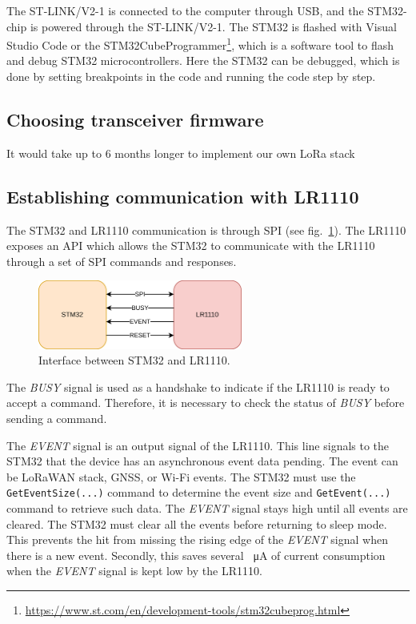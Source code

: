 The ST-LINK/V2-1 is connected to the computer through \ac{USB}, and the STM32-chip is powered through the ST-LINK/V2-1. The STM32 is flashed with Visual Studio Code or the STM32CubeProgrammer\footnote{\url{https://www.st.com/en/development-tools/stm32cubeprog.html}}, which is a software tool to flash and debug STM32 microcontrollers. Here the STM32 can be debugged, which is done by setting breakpoints in the code and running the code step by step.

\subsection{Choosing transceiver firmware}
It would take up to 6 months longer to implement our own \ac{LoRa} stack

\subsection{Establishing communication with LR1110}
The STM32 and LR1110 communication is through \ac{SPI} (see fig.~\ref{fig:stm32_lr1110_interface}). The LR1110 exposes an \ac{API} which allows the STM32 to communicate with the LR1110 through a set of \ac{SPI} commands and responses.

\begin{figure}[H]
    \centering
    \includegraphics[width=0.6\textwidth]{figures/STM32_LR1110_interface.png}
    \caption{Interface between STM32 and LR1110.}
    \label{fig:stm32_lr1110_interface}
\end{figure}

The \textit{BUSY} signal is used as a handshake to indicate if the LR1110 is ready to accept a command. Therefore, it is necessary to check the status of \textit{BUSY} before sending a command.

The \textit{EVENT} signal is an output signal of the LR1110. This line signals to the STM32 that the device has an asynchronous event data pending. The event can be \ac{LoRaWAN} stack, \ac{GNSS}, or Wi-Fi events. The STM32 must use the \lstinline[style=C++]{GetEventSize(...)} command to determine the event size and \lstinline[style=C++]{GetEvent(...)} command to retrieve such data. The \textit{EVENT} signal stays high until all events are cleared. The STM32 must clear all the events before returning to sleep mode. This prevents the hit from missing the rising edge of the \textit{EVENT} signal when there is a new event. Secondly, this saves several \SI{}{\micro\ampere} of current consumption when the \textit{EVENT} signal is kept low by the LR1110.


